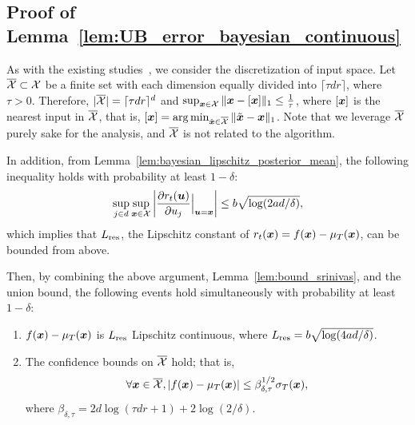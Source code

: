 \subsection{Proof of Lemma~\ref{lem:UB_error_bayesian_continuous}}
\label{sec:proof_UB_error_bayesian_continuous}


As with the existing studies~\citep[e.g., ][]{Srinivas2010-Gaussian}, we consider the discretization of input space.
%
Let $\overline{{\cal X}} \subset {\cal X}$ be a finite set with each dimension equally divided into $\lceil \tau d r \rceil$, where $\tau > 0$.
%
Therefore, $|\overline{{\cal X}}| = \lceil \tau d r \rceil^d$ and $\sup_{\boldsymbol{x} \in {\cal X}} \| \boldsymbol{x} - [\boldsymbol{x}] \|_1 \leq \frac{1}{\tau}$, where $[\boldsymbol{x}]$ is the nearest input in $\overline{{\cal X}}$, that is, $[\boldsymbol{x}] = \operatorname*{arg\,min}_{\tilde{\boldsymbol{x}} \in \overline{{\cal X}}} \|\tilde{\boldsymbol{x}} - \boldsymbol{x} \|_1$.
%
Note that we leverage $\overline{{\cal X}}$ purely sake for the analysis, and $\overline{{\cal X}}$ is not related to the algorithm.


In addition, from Lemma~\ref{lem:bayesian_lipschitz_posterior_mean}, the following inequality holds with probability at least $1 - \delta$:
\begin{align*}
    \sup_{j \in d} \sup_{\boldsymbol{x} \in {\cal X}} 
    \left| \frac{\partial r_t(\boldsymbol{u})}{\partial u_j} \Big|_{\boldsymbol{u} = \boldsymbol{x}} \right|
    \leq b \sqrt{\log (2ad / \delta)},
\end{align*}
which implies that $L_{\rm res}$, the Lipschitz constant of $r_t(\boldsymbol{x}) = f(\boldsymbol{x}) - \mu_T(\boldsymbol{x})$, can be bounded from above.



Then, by combining the above argument, Lemma~\ref{lem:bound_srinivas}, and the union bound, the following events hold simultaneously with probability at least $1 - \delta$:
\begin{enumerate}
    \item $f(\boldsymbol{x}) - \mu_T(\boldsymbol{x})$ is $L_{\rm res}$ Lipschitz continuous, where $L_{\rm res} =b \sqrt{\log (4ad / \delta)}$.
    \item The confidence bounds on $\overline{{\cal X}}$ hold; that is, 
    \begin{align*}
        \forall \boldsymbol{x} \in \overline{{\cal X}}, |f(\boldsymbol{x}) - \mu_T(\boldsymbol{x})| \leq \beta_{\delta, \tau}^{1/2} \sigma_T (\boldsymbol{x}),
    \end{align*}
    where $\beta_{\delta, \tau} = 2d \log (\tau d r + 1) + 2 \log (2 / \delta)$.
\end{enumerate}



